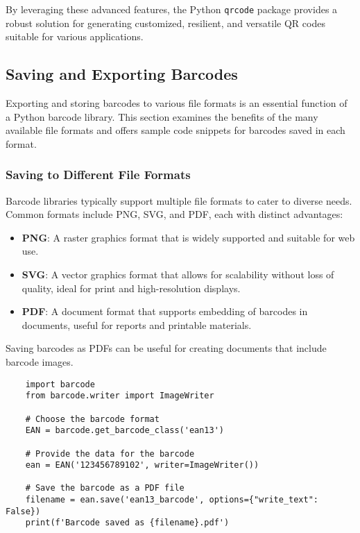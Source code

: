 By leveraging these advanced features, the Python \texttt{qrcode} package provides a robust solution for generating customized, resilient, and versatile QR codes suitable for various applications. \cite{geeksforgeeksqrcode:2023}

\subsection{Saving and Exporting Barcodes}

Exporting and storing barcodes to various file formats is an essential function of a Python barcode library. This section examines the benefits of the many available file formats and offers sample code snippets for barcodes saved in each format.\cite{Zellepython:2004}

\subsubsection{Saving to Different File Formats}

Barcode libraries typically support multiple file formats to cater to diverse needs. Common formats include PNG, SVG, and PDF, each with distinct advantages:

\begin{itemize}
	\item \textbf{PNG}: A raster graphics format that is widely supported and suitable for web use.
	\item \textbf{SVG}: A vector graphics format that allows for scalability without loss of quality, ideal for print and high-resolution displays.
	\item \textbf{PDF}: A document format that supports embedding of barcodes in documents, useful for reports and printable materials.
\end{itemize}

Saving barcodes as PDFs can be useful for creating documents that include barcode images.

\begin{lstlisting}
	import barcode
	from barcode.writer import ImageWriter
	
	# Choose the barcode format
	EAN = barcode.get_barcode_class('ean13')
	
	# Provide the data for the barcode
	ean = EAN('123456789102', writer=ImageWriter())
	
	# Save the barcode as a PDF file
	filename = ean.save('ean13_barcode', options={"write_text": False})
	print(f'Barcode saved as {filename}.pdf')
\end{lstlisting}

